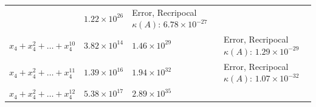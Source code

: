 \documentclass[
]{article}
\begin{document}
\begin{longtable}[]{@{}llll@{}}
\begin{minipage}[t]{0.15\columnwidth}
\end{minipage} & \begin{minipage}[t]{0.15\columnwidth}\raggedright
\(1.22 \times 10^{26}\)\strut
\end{minipage} & \begin{minipage}[t]{0.36\columnwidth}\raggedright
Error, Recripocal \(\kappa(A)\): \(6.78 \times 10^{-27}\)\strut
\end{minipage}\tabularnewline
\begin{minipage}[t]{0.23\columnwidth}\raggedright
\(x_{4}+x_{4}^{2}+\dots+x_{4}^{10}\)\strut
\end{minipage} & \begin{minipage}[t]{0.15\columnwidth}\raggedright
\(3.82 \times 10^{14}\)\strut
\end{minipage} & \begin{minipage}[t]{0.15\columnwidth}\raggedright
\(1.46 \times 10^{29}\)\strut
\end{minipage} & \begin{minipage}[t]{0.36\columnwidth}\raggedright
Error, Recripocal \(\kappa(A)\): \(1.29 \times 10^{-29}\)\strut
\end{minipage}\tabularnewline
\begin{minipage}[t]{0.23\columnwidth}\raggedright
\(x_{4}+x_{4}^{2}+\dots+x_{4}^{11}\)\strut
\end{minipage} & \begin{minipage}[t]{0.15\columnwidth}\raggedright
\(1.39 \times 10^{16}\)\strut
\end{minipage} & \begin{minipage}[t]{0.15\columnwidth}\raggedright
\(1.94 \times 10^{32}\)\strut
\end{minipage} & \begin{minipage}[t]{0.36\columnwidth}\raggedright
Error, Recripocal \(\kappa(A)\): \(1.07 \times 10^{-32}\)\strut
\end{minipage}\tabularnewline
\begin{minipage}[t]{0.23\columnwidth}\raggedright
\(x_{4}+x_{4}^{2}+\dots+x_{4}^{12}\)\strut
\end{minipage} & \begin{minipage}[t]{0.15\columnwidth}\raggedright
\(5.38 \times 10^{17}\)\strut
\end{minipage} & \begin{minipage}[t]{0.15\columnwidth}\raggedright
\(2.89 \times 10^{35}\)\strut
\end{minipage} & \begin{minipage}[t]{0.36\columnwidth}\raggedright

\end{minipage}
\end{longtable}
\end{document}
